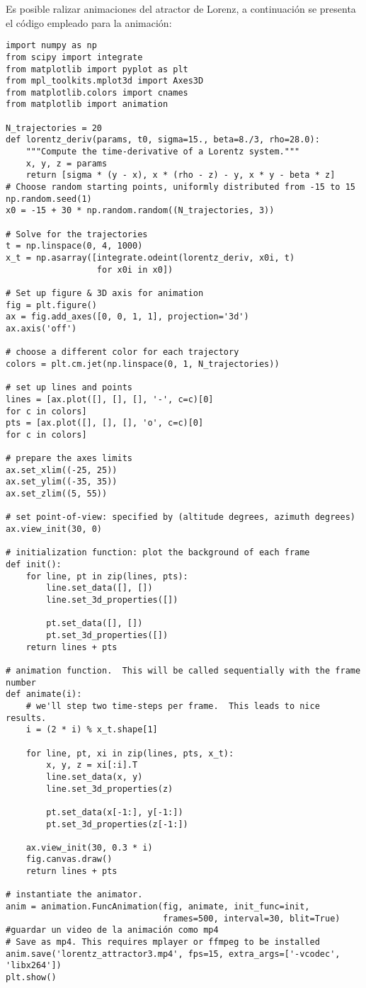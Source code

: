 \documentclass[12pt]{article}
\begin{document}
Es posible ralizar animaciones del atractor de Lorenz, a continuación se presenta el código empleado para la animación:


\begin{verbatim}
import numpy as np
from scipy import integrate
from matplotlib import pyplot as plt
from mpl_toolkits.mplot3d import Axes3D
from matplotlib.colors import cnames
from matplotlib import animation

N_trajectories = 20
def lorentz_deriv(params, t0, sigma=15., beta=8./3, rho=28.0):
    """Compute the time-derivative of a Lorentz system."""
    x, y, z = params
    return [sigma * (y - x), x * (rho - z) - y, x * y - beta * z]
# Choose random starting points, uniformly distributed from -15 to 15
np.random.seed(1)
x0 = -15 + 30 * np.random.random((N_trajectories, 3))

# Solve for the trajectories
t = np.linspace(0, 4, 1000)
x_t = np.asarray([integrate.odeint(lorentz_deriv, x0i, t)
                  for x0i in x0])

# Set up figure & 3D axis for animation
fig = plt.figure()
ax = fig.add_axes([0, 0, 1, 1], projection='3d')
ax.axis('off')

# choose a different color for each trajectory
colors = plt.cm.jet(np.linspace(0, 1, N_trajectories))

# set up lines and points
lines = [ax.plot([], [], [], '-', c=c)[0]
for c in colors]
pts = [ax.plot([], [], [], 'o', c=c)[0]
for c in colors]

# prepare the axes limits
ax.set_xlim((-25, 25))
ax.set_ylim((-35, 35))
ax.set_zlim((5, 55))

# set point-of-view: specified by (altitude degrees, azimuth degrees)
ax.view_init(30, 0)

# initialization function: plot the background of each frame
def init():
    for line, pt in zip(lines, pts):
        line.set_data([], [])
        line.set_3d_properties([])

        pt.set_data([], [])
        pt.set_3d_properties([])
    return lines + pts

# animation function.  This will be called sequentially with the frame number
def animate(i):
    # we'll step two time-steps per frame.  This leads to nice results.
    i = (2 * i) % x_t.shape[1]

    for line, pt, xi in zip(lines, pts, x_t):
        x, y, z = xi[:i].T
        line.set_data(x, y)
        line.set_3d_properties(z)

        pt.set_data(x[-1:], y[-1:])
        pt.set_3d_properties(z[-1:])

    ax.view_init(30, 0.3 * i)
    fig.canvas.draw()
    return lines + pts

# instantiate the animator.
anim = animation.FuncAnimation(fig, animate, init_func=init,
                               frames=500, interval=30, blit=True)
#guardar un video de la animación como mp4
# Save as mp4. This requires mplayer or ffmpeg to be installed
anim.save('lorentz_attractor3.mp4', fps=15, extra_args=['-vcodec', 'libx264'])
plt.show()
\end{verbatim}
\end{document}
